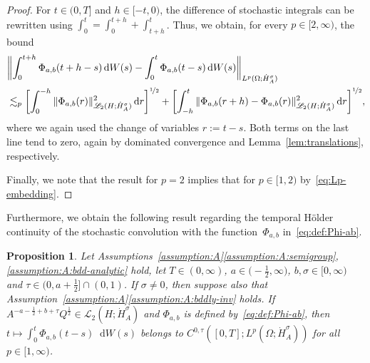 \documentclass[reqno]{amsart}
\numberwithin{equation}{section}
\newcommand{\norm}[2]{     \| #1       \|_{ #2 }}
\newcommand{\rd}{\mathop{}\!\mathrm{d}}
\newcommand{\Hdot}[1]{\dot{H}^{#1}_A}
\newtheorem{proposition}[lemma]{Proposition}
\theoremstyle{remark}
\theoremstyle{definition}
\begin{document}
\begin{proof}
	For $t\in(0,T]$ and $h\in[-t, 0)$, 
	the difference of stochastic integrals 
	can be rewritten using $\int_0^t = \int_0^{t+h} + \int_{t+h}^t$. 
	Thus, we obtain, for every $p\in[2,\infty)$, the bound 
	\begin{align*}
	&\biggl\| 
	\int_0^{t+h} \Phi_{a,b}(t+h-s) \rd W(s) 
	- 
	\int_0^t \Phi_{a,b}(t-s)\rd W(s) 
	\biggr\|_{L^p(\Omega;\Hdot\sigma)} 
	\\ 
	&\lesssim_p 
	\biggl[ \int_0^{-h} 
	\norm{\Phi_{a,b}(r)}{\mathscr L_2(H;\dot H_A^\sigma)}^2 \rd r 
	\biggr]^{\nicefrac{1}{2}} 
	+ 
	\biggl[ \int_{-h}^t 
	\norm{\Phi_{a,b}(r+h) - \Phi_{a,b}(r)}{\mathscr L_2(H;\dot H_A^\sigma)}^2 
	\rd r \biggr]^{\nicefrac{1}{2}}, 
	\end{align*}
	where we again used the change of 
	variables $r := t-s$. 
	Both terms on the last line tend to zero, 
	again by dominated convergence and 
	Lemma~\ref{lem:translations}, respectively.
	
	Finally, we note 
	that the result for $p=2$ implies that 
	for $p\in[1,2)$ by~\eqref{eq:Lp-embedding}. 
\end{proof}

Furthermore, we obtain the following result 
regarding the temporal H\"older continuity of 
the stochastic 
convolution with the 
function~$\Phi_{a,b}$ 
in~\eqref{eq:def:Phi-ab}. 

%
\begin{proposition}\label{prop:regularity-stoch-conv}
	Let 
	Assumptions~\textup{\ref{assumption:A}\ref{assumption:A:semigroup},\ref{assumption:A:bdd-analytic}} 
	hold, 
	let $T \in (0,\infty)$, 
	${a \in \bigl(-\frac{1}{2},\infty\bigr)}$, ${b, \sigma \in [0,\infty)}$ 
	and $\tau\in\bigl( 0,a + \frac{1}{2} \bigr] \cap (0,1)$. 
	If $\sigma \neq 0$, then suppose also that
	Assumption~\textup{\ref{assumption:A}\ref{assumption:A:bddly-inv}} holds. 
	If
	$A^{-a-\frac{1}{2} +b+\tau} Q^{\frac{1}{2}} \in \mathscr L_2(H; \dot H_A^\sigma)$ 
	and $\Phi_{a,b}$ is defined  
	by~\eqref{eq:def:Phi-ab},
	then
	$t \mapsto \int_0^t \Phi_{a,b}(t-s)\rd W(s)$
	belongs to $C^{0,\tau}([0,T];L^p(\Omega;\dot H_A^\sigma))$ 
	for all $p \in [1,\infty)$. 
\end{proposition}
\end{document}
